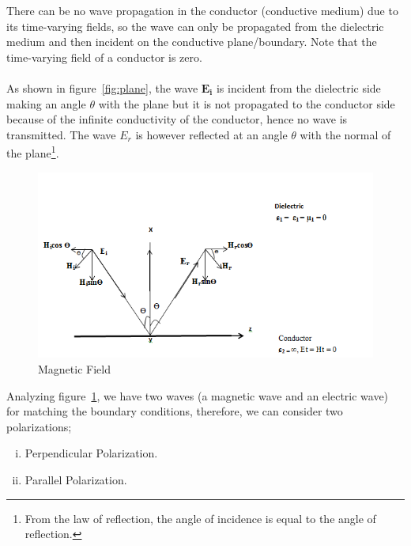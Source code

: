 There can be no wave propagation in the conductor (conductive medium) due to its time-varying fields, so the wave can only be propagated from the dielectric medium and then incident on the conductive plane/boundary. Note that the time-varying field of a conductor is zero.\\\\ 
As shown in figure~\ref{fig:plane}, the wave $\boldsymbol{E_i}$  is incident from the dielectric side making an angle $ \theta $ with the plane but it is not propagated to the conductor side because of the infinite conductivity of the conductor, hence no wave is transmitted. The wave $E_r$ is however reflected at an angle $ \theta $ with the normal of the plane\footnote{From the law of reflection, the angle of incidence is equal to the angle of reflection.}.
\begin{figure}[h]
\centering
\includegraphics[width=1\linewidth]{./graphics/fields}
\caption{Magnetic Field}
\label{fig:fields}
\end{figure}

Analyzing figure~\ref{fig:fields}, we have two waves (a magnetic wave and an electric wave) for matching the boundary conditions, therefore, we can consider two polarizations;
\begin{enumerate}[(i)]
\item Perpendicular Polarization. 
\item  Parallel Polarization.
\end{enumerate}

